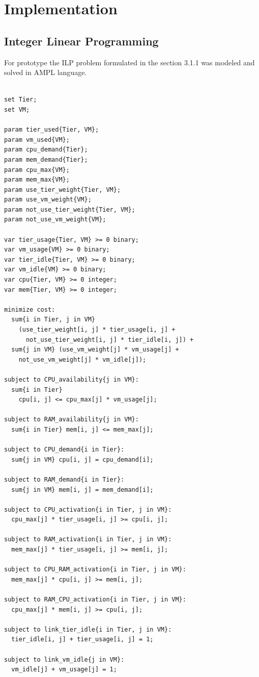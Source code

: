 \chapter{Implementation}
\label{implementation}

\section{Integer Linear Programming}
For prototype the ILP problem formulated in the section 3.1.1 was modeled and solved in AMPL language.

\begin{lstlisting}[caption=AMPL model]

set Tier; 
set VM;

param tier_used{Tier, VM}; 
param vm_used{VM};
param cpu_demand{Tier};
param mem_demand{Tier};
param cpu_max{VM};
param mem_max{VM};
param use_tier_weight{Tier, VM};
param use_vm_weight{VM};
param not_use_tier_weight{Tier, VM};
param not_use_vm_weight{VM};

var tier_usage{Tier, VM} >= 0 binary;
var vm_usage{VM} >= 0 binary;
var tier_idle{Tier, VM} >= 0 binary;
var vm_idle{VM} >= 0 binary;
var cpu{Tier, VM} >= 0 integer;
var mem{Tier, VM} >= 0 integer; 

minimize cost:
  sum{i in Tier, j in VM} 
    (use_tier_weight[i, j] * tier_usage[i, j] +
      not_use_tier_weight[i, j] * tier_idle[i, j]) + 
  sum{j in VM} (use_vm_weight[j] * vm_usage[j] + 
    not_use_vm_weight[j] * vm_idle[j]);

subject to CPU_availability{j in VM}:
  sum{i in Tier} 
    cpu[i, j] <= cpu_max[j] * vm_usage[j];

subject to RAM_availability{j in VM}:
  sum{i in Tier} mem[i, j] <= mem_max[j];

subject to CPU_demand{i in Tier}:
  sum{j in VM} cpu[i, j] = cpu_demand[i];

subject to RAM_demand{i in Tier}:
  sum{j in VM} mem[i, j] = mem_demand[i];

subject to CPU_activation{i in Tier, j in VM}:
  cpu_max[j] * tier_usage[i, j] >= cpu[i, j];

subject to RAM_activation{i in Tier, j in VM}:
  mem_max[j] * tier_usage[i, j] >= mem[i, j];

subject to CPU_RAM_activation{i in Tier, j in VM}:
  mem_max[j] * cpu[i, j] >= mem[i, j];

subject to RAM_CPU_activation{i in Tier, j in VM}:
  cpu_max[j] * mem[i, j] >= cpu[i, j];

subject to link_tier_idle{i in Tier, j in VM}:
  tier_idle[i, j] + tier_usage[i, j] = 1;

subject to link_vm_idle{j in VM}:
  vm_idle[j] + vm_usage[j] = 1;
\end{lstlisting}

